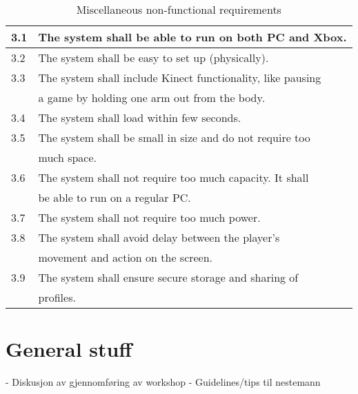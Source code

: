 \begin{table} [H]
\label{tab:nfunc2}
\centering
\begin{tabular}{|l|l|}
\hline
3.1 & The system shall be able to run on both PC and Xbox. \\ \hline
3.2 & The system shall be easy to set up (physically).\\ \hline
3.3 & The system shall include Kinect functionality, like pausing \\ & a game by holding one arm out from the body. \\ \hline
3.4 & The system shall load within few seconds.\\ \hline
3.5 & The system shall be small in size and do not require too \\&  much space.\\ \hline
3.6 & The system shall not require too much capacity. It shall \\ & be able to run on a regular PC. \\ \hline
3.7 & The system shall not require too much power. \\ \hline
3.8 & The system shall avoid delay between the player's \\ & movement and action on the screen.\\ \hline
3.9 & The system shall ensure secure storage and sharing of \\ & profiles. \\ \hline
\end{tabular}
\caption[Miscellaneous non-functional requirements]{Miscellaneous non-functional requirements}
\end{table} 

\section{General stuff}
- Diskusjon av gjennomføring av workshop
- Guidelines/tips til nestemann
